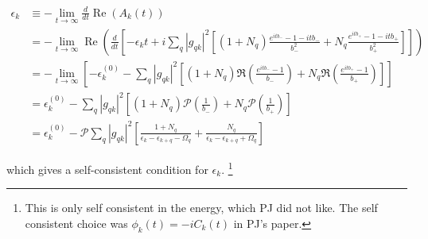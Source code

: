 \begin{align}
    \epsilon_k &\equiv -\lim_{t \rightarrow \infty} \frac{d}{d t} \operatorname{Re} \left( A_k(t) \right) \\
&= -\lim_{t \rightarrow \infty} \operatorname{Re} \left( \frac{d}{d t} \left[ -\epsilon_k t + i \sum_q |g_{qk}|^2 \left[ \left(1 + N_q \right) \frac{e^{i t b_{-}} - 1 - i t b_{-}}{b_{-}^2} + N_q \frac{e^{i t b_{+}} - 1 - i t b_{+}}{b_{+}^2} \right] \right] \right) \\
&= -\lim_{t \rightarrow \infty} \left[ -\epsilon_k^{(0)}-\sum_q\left|g_{q k}\right|^2\left[\left(1+N_q\right) \Re\left(\frac{e^{i t b_{-}}-1}{b_{-}}\right)+N_q \Re\left(\frac{e^{i t b_{+}}-1}{b_{+}}\right)\right] \right] \\
&= \epsilon_k^{(0)} - \sum_q\left|g_{q k}\right|^2\left[\left(1+N_q\right) \mathcal{P}\left(\frac{1}{b_{-}}\right)+N_q \mathcal{P}\left(\frac{1}{b_{+}}\right)\right] \\
&= \epsilon_k^{(0)} - \mathcal{P} \sum_q\left|g_{q k}\right|^2\left[\frac{1+N_q}{\epsilon_k-\epsilon_{k+q}-\Omega_q}+\frac{N_q}{\epsilon_k-\epsilon_{k+q}+\Omega_q}\right]
\end{align}


which gives a self-consistent condition for $\epsilon_k$. \footnote{This is only self consistent in the energy, which PJ did not like.  The self consistent choice was $\phi_k(t)=-iC_k(t)$ in PJ's paper.}



